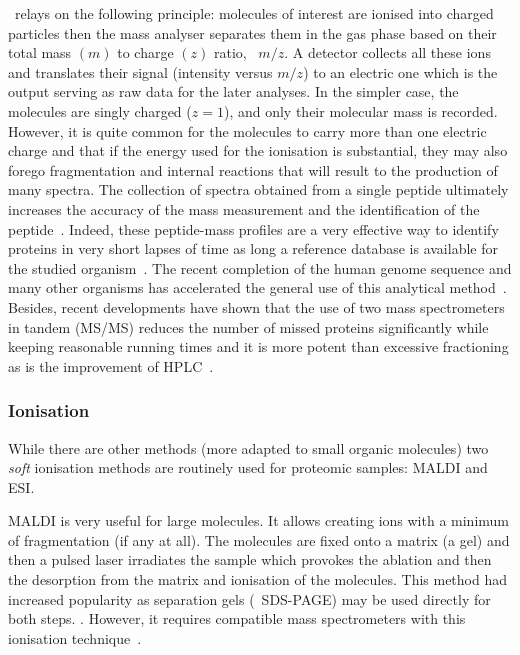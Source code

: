 \ms\ relays on the following principle: molecules of interest are ionised
into charged particles then the mass analyser separates them in the gas phase
based on their total mass $(m)$ to charge $(z)$ ratio, \ie\ $m/z$.
A detector collects all these ions and translates their signal (intensity versus
$m/z$) to an electric one which is the output serving as raw data for the
later analyses. In the simpler case, the molecules are singly charged ($z=1$),
and only their molecular mass is recorded. However, it is quite common for the
molecules to carry more than one electric charge and that if the energy used for
the ionisation is substantial, they may also forego fragmentation and internal
reactions that will result to the production of many spectra. The collection
of spectra obtained from a single peptide ultimately increases the accuracy of
the mass measurement and the identification of the peptide~.
Indeed, these peptide-mass profiles are a very effective way to identify
proteins in very short lapses of time as long a reference database is available
for the studied organism~. The recent completion of the human
genome sequence and many other organisms has accelerated the general use of this
analytical method~. Besides, recent developments have
shown that the use of two mass spectrometers in tandem (\gls{MS/MS}) reduces
the number of missed proteins significantly while keeping reasonable running
times and it is more potent than excessive fractioning as is the improvement
of \gls{HPLC}~.\mybr\

\subsubsection{Ionisation}

While there are other methods (more adapted to small organic molecules)
two \emph{soft} ionisation methods are routinely used for proteomic samples:
\acrfull{MALDI} and \acrfull{ESI}.\mybr\

\gls{MALDI} is very useful for large molecules. It allows creating ions with a
minimum of fragmentation (if any at all). The molecules are fixed onto a matrix
(a gel) and then a pulsed \gls{laser} irradiates the sample which provokes the
ablation and then the desorption from the matrix and ionisation of the molecules.
This method had increased popularity as separation gels (\eg\ \gls{SDS-PAGE})
may be used directly for both steps. .
However, it requires compatible mass spectrometers
with this ionisation technique~.\mybr\

